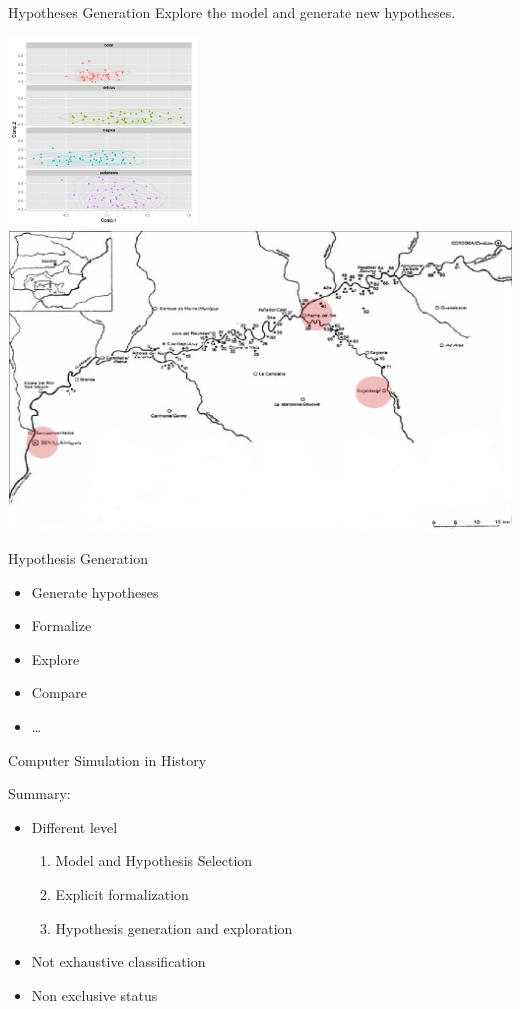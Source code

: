 \documentclass[12pt, notes=show]{beamer}
\begin{document}
\begin{frame}{Hypotheses Generation}
    Explore the model and generate new hypotheses.
    \begin{center}
	{\includegraphics[height=5cm]{images/pca.png}}
	\includegraphics[width=.4\textwidth]{images/Beti.png}
    \end{center}
\end{frame}
  


\begin{frame}{Hypothesis Generation}
    

    \begin{itemize}
	\item Generate hypotheses 
	\item Formalize
	\item Explore
	\item Compare
	\item \dots
    \end{itemize}
    \vfill
    \vfill

\end{frame}

\begin{frame}{Computer Simulation in History}

    Summary:
    \begin{itemize}
	\item Different level
	    \begin{enumerate}
		\item Model and Hypothesis Selection
		\item Explicit formalization
		\item Hypothesis generation and exploration
	    \end{enumerate}
	\item Not exhaustive classification
	\item Non exclusive status
    \end{itemize}
    

\end{frame}
\end{document}
